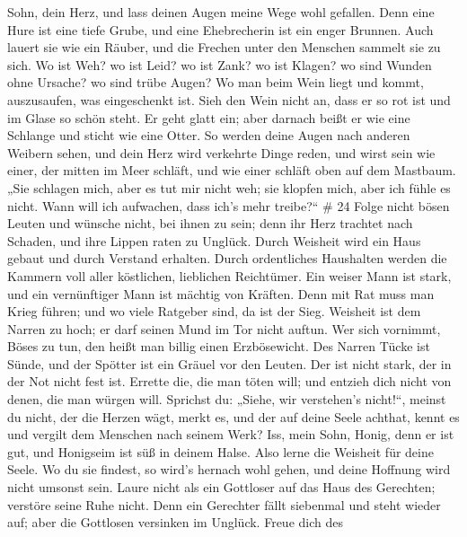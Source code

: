Sohn, dein Herz, und lass deinen Augen meine Wege wohl gefallen.
 Denn eine Hure ist eine tiefe Grube, und eine Ehebrecherin
ist ein enger Brunnen.  Auch lauert sie wie ein Räuber, und
die Frechen unter den Menschen sammelt sie zu sich.  Wo ist
Weh? wo ist Leid? wo ist Zank? wo ist Klagen? wo sind Wunden ohne
Ursache? wo sind trübe Augen?  Wo man beim Wein liegt und
kommt, auszusaufen, was eingeschenkt ist.  Sieh den Wein
nicht an, dass er so rot ist und im Glase so schön steht. Er geht glatt
ein;  aber darnach beißt er wie eine Schlange und sticht
wie eine Otter.  So werden deine Augen nach anderen Weibern
sehen, und dein Herz wird verkehrte Dinge reden,  und wirst
sein wie einer, der mitten im Meer schläft, und wie einer schläft oben
auf dem Mastbaum.  „Sie schlagen mich, aber es tut mir
nicht weh; sie klopfen mich, aber ich fühle es nicht. Wann will ich
aufwachen, dass ich's mehr treibe?{}`` \# 24  Folge nicht
bösen Leuten und wünsche nicht, bei ihnen zu sein;  denn ihr
Herz trachtet nach Schaden, und ihre Lippen raten zu Unglück.
 Durch Weisheit wird ein Haus gebaut und durch Verstand
erhalten.  Durch ordentliches Haushalten werden die Kammern
voll aller köstlichen, lieblichen Reichtümer.  Ein weiser
Mann ist stark, und ein vernünftiger Mann ist mächtig von Kräften.
 Denn mit Rat muss man Krieg führen; und wo viele Ratgeber
sind, da ist der Sieg.  Weisheit ist dem Narren zu hoch; er
darf seinen Mund im Tor nicht auftun.  Wer sich vornimmt,
Böses zu tun, den heißt man billig einen Erzbösewicht.  Des
Narren Tücke ist Sünde, und der Spötter ist ein Gräuel vor den Leuten.
 Der ist nicht stark, der in der Not nicht fest ist.
 Errette die, die man töten will; und entzieh dich nicht
von denen, die man würgen will.  Sprichst du: „Siehe, wir
verstehen's nicht!{}``, meinst du nicht, der die Herzen wägt, merkt es,
und der auf deine Seele achthat, kennt es und vergilt dem Menschen nach
seinem Werk?  Iss, mein Sohn, Honig, denn er ist gut, und
Honigseim ist süß in deinem Halse.  Also lerne die Weisheit
für deine Seele. Wo du sie findest, so wird's hernach wohl gehen, und
deine Hoffnung wird nicht umsonst sein.  Laure nicht als
ein Gottloser auf das Haus des Gerechten; verstöre seine Ruhe nicht.
 Denn ein Gerechter fällt siebenmal und steht wieder auf;
aber die Gottlosen versinken im Unglück.  Freue dich des
